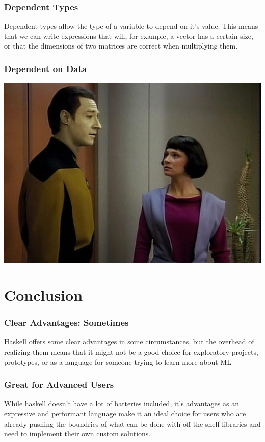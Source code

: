 \documentclass{beamer}
\begin{document}
\begin{frame}
  \frametitle{Dependent Types}
  Dependent types allow the type of a variable to depend on it's
  value.  This means that we can write expressions that will, for
  example, a vector has a certain size, or that the dimensions of two
  matrices are correct when multiplying them.
\end{frame}

\begin{frame}[fragile]
  \frametitle{Dependent on Data}
    \begin{center}
    \includegraphics[width=.85\paperwidth]{images/dependent-data.jpg}
  \end{center}
\end{frame}

\section{Conclusion}

\begin{frame}
  \frametitle{Clear Advantages: Sometimes}
  Haskell offers some clear advantages in some circumstances, but the
  overhead of realizing them means that it might not be a good choice
  for exploratory projects, prototypes, or as a language for someone
  trying to learn more about ML
\end{frame}

\begin{frame}
  \frametitle{Great for Advanced Users}
  While haskell doesn't have a lot of batteries included, it's
  advantages as an expressive and performant language make it an ideal
  choice for users who are already pushing the boundries of what can
  be done with off-the-shelf libraries and need to implement their own
  custom solutions.
\end{frame}
\end{document}
